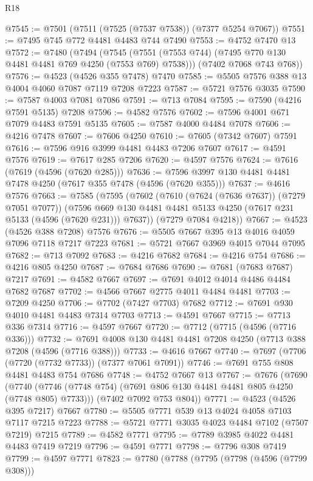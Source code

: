 \begin{lexlean}{R18}
\begin{coremodule}
@7545 := @7501 (@7511 (@7525 (@7537 @7538)) (@7377 @5254 @7067))
@7551 := @7495 @745 @772 @4481 @4483 @744 @7490
@7553 := @4752 @7470 @13
@7572 := @7480
    (@7494
      (@7545 (@7551 (@7553 @744) (@7495 @770 @130 @4481 @4481 @769 @4250 (@7553 @769) @7538)))
      (@7402 @7068 @743 @768))
@7576 := @4523 (@4526 @355 @7478) @7470
@7585 := @5505 @7576 @388 @13 @4004 @4060 @7087 @7119 @7208 @7223
@7587 := @5721 @7576 @3035
@7590 := @7587 @4003 @7081 @7086
@7591 := @713 @7084
@7595 := @7590 (@4216 @7591 @5135) @7208
@7596 := @4582 @7576
@7602 := @7596 @4001 @671 @7079 @4483 @7591 @5135
@7605 := @7587 @4000 @4484 @7078
@7606 := @4216 @7478
@7607 := @7606 @4250
@7610 := @7605 (@7342 @7607) @7591
@7616 := @7596 @916 @3999 @4481 @4483 @7206 @7607
@7617 := @4591 @7576
@7619 := @7617 @285 @7206
@7620 := @4597 @7576
@7624 := @7616 (@7619 (@4596 (@7620 @285)))
@7636 := @7596 @3997 @130 @4481 @4481 @7478 @4250 (@7617 @355 @7478 (@4596 (@7620 @355)))
@7637 := @4616 @7576
@7663 := @7585
    (@7595
      (@7602
        (@7610 (@7624 (@7636 @7637)) (@7279 @7051 @7077))
        (@7596 @669 @130 @4481 @4481 @5133 @4250 (@7617 @231 @5133 (@4596 (@7620 @231))) @7637))
      (@7279 @7084 @4218))
@7667 := @4523 (@4526 @388 @7208) @7576
@7676 := @5505 @7667 @395 @13 @4016 @4059 @7096 @7118 @7217 @7223
@7681 := @5721 @7667 @3969 @4015 @7044 @7095
@7682 := @713 @7092
@7683 := @4216 @7682
@7684 := @4216 @754
@7686 := @4216 @805 @4250
@7687 := @7684 @7686
@7690 := @7681 (@7683 @7687) @7217
@7691 := @4582 @7667
@7697 := @7691 @4012 @4014 @4486 @4484 @7682 @7687
@7702 := @4566 @7667 @2775 @4011 @4484 @4481
@7703 := @7209 @4250
@7706 := @7702 (@7427 @7703) @7682
@7712 := @7691 @930 @4010 @4481 @4483 @7314 @7703
@7713 := @4591 @7667
@7715 := @7713 @336 @7314
@7716 := @4597 @7667
@7720 := @7712 (@7715 (@4596 (@7716 @336)))
@7732 := @7691 @4008 @130 @4481 @4481 @7208 @4250 (@7713 @388 @7208 (@4596 (@7716 @388)))
@7733 := @4616 @7667
@7740 := @7697 (@7706 (@7720 (@7732 @7733)) (@7377 @7061 @7091))
@7746 := @7691 @755 @808 @4481 @4483 @754 @7686
@7748 := @4752 @7667 @13
@7767 := @7676
    (@7690
      (@7740 (@7746 (@7748 @754) (@7691 @806 @130 @4481 @4481 @805 @4250 (@7748 @805) @7733)))
      (@7402 @7092 @753 @804))
@7771 := @4523 (@4526 @395 @7217) @7667
@7780 := @5505 @7771 @539 @13 @4024 @4058 @7103 @7117 @7215 @7223
@7788 := @5721 @7771 @3035 @4023 @4484 @7102 (@7507 @7219) @7215
@7789 := @4582 @7771
@7795 := @7789 @3985 @4022 @4481 @4483 @7419 @7219
@7796 := @4591 @7771
@7798 := @7796 @308 @7419
@7799 := @4597 @7771
@7823 := @7780
    (@7788
      (@7795
        (@7798 (@4596 (@7799 @308)))

\end{coremodule}
\end{lexlean}
